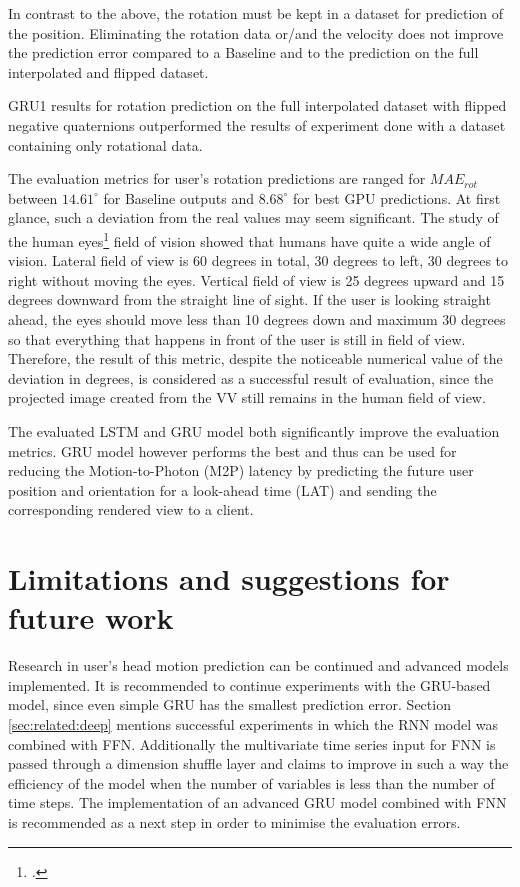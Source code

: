 In contrast to the above, the rotation must be kept in a dataset for prediction of the position. Eliminating the rotation data or/and the velocity does not improve the prediction error compared to a Baseline and to the prediction on the full interpolated and flipped dataset.

GRU1 results for rotation prediction on the full interpolated dataset with flipped negative quaternions outperformed the results of experiment done with a dataset containing only rotational data. 

The evaluation metrics for user's rotation predictions are ranged for $MAE_{rot}$ between $14.61^{\circ}$ for Baseline outputs and $8.68^{\circ}$ for best GPU predictions. At first glance, such a deviation from the real values may seem significant. The study of the human eyes\footcite{https://medium.com/@catalin.macovei/positioning-of-infotainment-screen-in-cars-e4cffa1e5697} field of vision showed that humans have quite a wide angle of vision. Lateral field of view is 60 degrees in total, 30 degrees to left, 30 degrees to right without moving the eyes. Vertical field of view is 25 degrees upward and 15 degrees downward from the straight line of sight. If the user is looking straight ahead, the eyes should move less than 10 degrees down and maximum 30 degrees so that everything that happens in front of the user is still in field of view. Therefore, the result of this metric, despite the noticeable numerical value of the deviation in degrees, is considered as a successful result of evaluation, since the projected image created from the VV still remains in the human field of view.

The evaluated LSTM and GRU model both significantly improve the evaluation metrics. GRU model however performs the best and thus can be used for reducing the Motion-to-Photon (M2P) latency by predicting the future user position and orientation for a look-ahead time (LAT) and sending the corresponding rendered view to a client.

\section{Limitations and suggestions for future work}
\label{sec:conclusion:future}
Research in user's head motion prediction can be continued and advanced models implemented. It is recommended to continue experiments with the GRU-based model, since even simple GRU has the smallest prediction error. Section \ref{sec:related:deep} mentions successful experiments in which the RNN model was combined with FFN. Additionally the multivariate time series input for FNN is passed through a dimension shuffle layer and \cite{lstm_fcn} claims to improve in such a way the efficiency of the model when the number of variables is less than the number of time steps. The implementation of an advanced GRU model combined with FNN is recommended as a next step in order to minimise the evaluation errors. 

